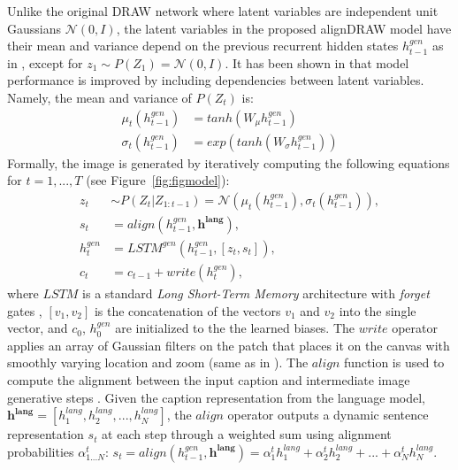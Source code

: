 \documentclass{article} %
\newcommand{\hlang}{h^{lang}}
\newcommand{\hlangall}{\boldsymbol{h^{lang}}}
\newcommand{\hdec}{h^{gen}}
\newcommand{\writeop}{\mathit{write}}
\newcommand{\decoder}{\mathit{LSTM}^{gen}}
\newcommand{\canv}{c}
\newcommand{\lat}{z}
\newcommand{\Lat}{Z}
\newcommand{\prior}{P}
\begin{document}
Unlike the original DRAW network where latent variables are independent unit Gaussians $\mathcal{N}(0, I)$, the latent variables in the proposed alignDRAW model have their mean and variance depend on the previous recurrent hidden states $\hdec_{t-1}$ as in \citep{bachman_sdm}, except for $\lat_1 \sim \prior(\Lat_1) = \mathcal{N}(0, I)$. It has been shown in \citep{bachman_sdm} that model performance is improved by including dependencies between latent variables. Namely, the mean and variance of $\prior(\Lat_t)$ is: 
\begin{align}
\mu_{t}(\hdec_{t-1}) &= tanh(W_{\mu}\hdec_{t-1})\\
\sigma_{t}(\hdec_{t-1}) &= exp(tanh(W_{\sigma}\hdec_{t-1})) 
\end{align}
Formally, the image is generated by iteratively computing the following equations for $t=1,...,T$ (see Figure~\ref{fig:figmodel}):
\begin{align}
\label{eq:x_hat}
\lat_t &\sim \prior(\Lat_t|\Lat_{1:t-1}) = \mathcal{N}(\mu_{t}(\hdec_{t-1}), \sigma_{t}(\hdec_{t-1})),\\
s_{t} &= align(\hdec_{t-1}, \hlangall), \\
\hdec_t &= \decoder(\hdec_{t-1}, [z_t, s_{t}]), \\
\canv_t &= \canv_{t-1} + \writeop(\hdec_t), 
\label{eq:write}
\end{align}
where $\mathit{LSTM}$ is a standard \textit{Long Short-Term Memory} architecture \citep{hochreiter_lstm} with \textit{forget} gates \citep{gers_forget}, $[v_1, v_2]$ is the concatenation of the vectors $v_1$ and $v_2$ into the single vector, and $\canv_0$, $\hdec_0$ are initialized to the the learned biases. The $\writeop$ operator applies an array of Gaussian filters on the patch that places it on the canvas with smoothly varying location and zoom (same as in \citep{gregor_draw}). The $align$ function is used to compute the alignment between the input caption and intermediate image generative steps \citep{bahdanau_mt}. Given the caption representation from the language model, $\hlangall = [\hlang_{1}, \hlang_{2}, ..., \hlang_{N}]$, the $align$ operator outputs a dynamic sentence representation $s_t$ at each step through a weighted sum using alignment probabilities $\alpha_{1...N}^{t}$:
$s_t=align(\hdec_{t-1}, \hlangall) = \alpha_{1}^{t}\hlang_{1} + \alpha_{2}^{t}\hlang_{2} + ... + \alpha_{N}^{t}\hlang_{N}.$
\end{document}
